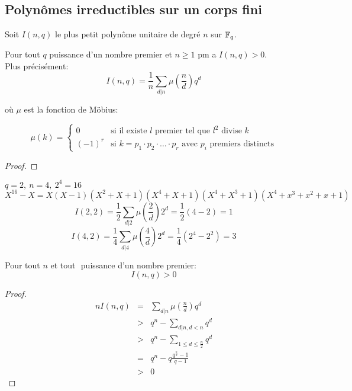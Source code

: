 \subsection{Polynômes irreductibles sur un corps fini}


Soit $I(n,q)$ le plus petit polynôme unitaire de degré $n$ sur $\mathbb{F}_q$.

\begin{theorem}
	Pour tout $q$ puissance d'un nombre premier et $n \geq 1$ pm a $I(n,q) > 0$.\\

	Plus précisément:
	$$ I(n,q) = \frac{1}{n} \sum_{d|n} \mu(\frac{n}{d}) q^d$$

	où $\mu$ est la fonction de Möbius:

	\[ \mu(k) = \left\{\begin{array}{ll}
			0      & \text{si il existe } l \text{ premier tel que } l^2 \text{ divise } k                            \\
			(-1)^r & \text{si } k = p_1 \cdot p_2 \cdot \ldots \cdot p_r \text{ avec } p_i \text{ premiers distincts}
		\end{array} \right.\]

\end{theorem}

\begin{proof}
\end{proof}

\begin{example}
	$ q = 2, \ n = 4, \ 2^4 = 16 $
	$$	X ^16 - X = X(X-1)(X^2 + X + 1)(X^4 + X + 1)(X^4 + X^3 + 1)(X^4 + x^3 + x^2 + x + 1) $$
	$$	I(2,2) = \frac{1}{2}\sum_{d|2} \mu(\frac{2}{d}) 2^d = \frac{1}{2}(4-2) = 1$$
	$$	I(4,2) = \frac{1}{4}\sum_{d|4} \mu(\frac{4}{d}) 2^d = \frac{1}{4}(2^4 - 2^2) = 3$$
\end{example}


\begin{coro}
	Pour tout $n$ et tout $ $ puissance d'un nombre premier:
	$$ I (n, q) > 0 $$
\end{coro}


\begin{proof}
	\begin{eqnarray*}
		n I(n, q) & = & \sum_{d|n} \mu(\frac{n}{d}) q^d \\
		&>& q^n - \sum_{d|n, d < n} q^d \\
		&>& q^n - \sum_{1 \leq d\leq \frac{n}{2}} q^d \\
		&=& q^n - q\frac{q^{\frac{n}{2}} - 1}{q-1} \\ %
		&>& 0
	\end{eqnarray*}
\end{proof}

